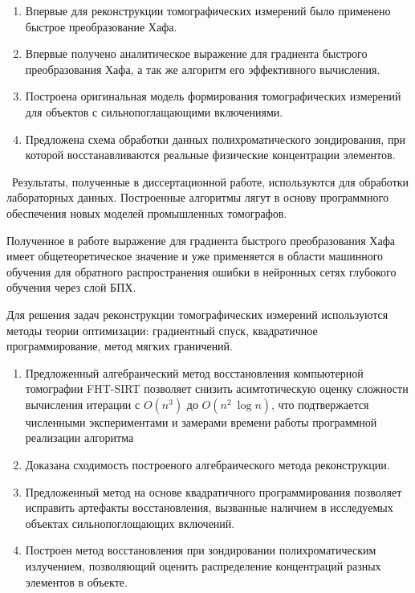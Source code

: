 {\novelty}
\begin{enumerate}
  \item Впервые для реконструкции томографических измерений было применено быстрое преобразование Хафа.
  \item Впервые получено аналитическое выражение для градиента быстрого преобразования Хафа, а так же алгоритм его эффективного вычисления.
  \item Построена оригинальная модель формирования томографических измерений для объектов с сильнопоглащающими включениями.
  \item Предложена схема обработки данных полихроматического зондирования, при которой восстанавливаются реальные физические концентрации элементов.
\end{enumerate}
{\influence} ~Результаты, полученные в диссертационной работе, используются для обработки лабораторных данных. Построенные алгоритмы лягут в основу программного обеспечения новых моделей промышленных томографов.

Полученное в работе выражение для градиента быстрого преобразования Хафа имеет общетеоретическое значение и уже применяется в области машинного обучения для обратного распространения ошибки в нейронных сетях глубокого обучения через слой БПХ.

{\methods}
Для решения задач реконструкции томографических измерений используются методы теории оптимизации: градиентный спуск, квадратичное программирование, метод мягких граничений.

{}
\begin{enumerate}
  \item Предложенный алгебраический метод восстановления компьютерной томографии FHT-SIRT позволяет снизить асимтотическую оценку сложности вычисления итерации с $O(n^3)$ до $O(n^2~\log n)$, что подтвержается численными экспериментами и замерами времени работы программной реализации алгоритма
  \item Доказана сходимость построеного алгебраического метода реконструкции. 
  \item Предложенный метод на основе квадратичного программирования позволяет исправить артефакты восстановления, вызванные наличием в исследуемых объектах сильнопоглощающих включений.
  \item Построен метод восстановления при зондировании полихроматическим излучением, позволяющий оценить распределение концентраций разных элементов в объекте.
\end{enumerate}


